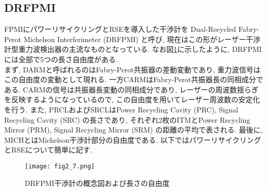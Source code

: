 \subsection{DRFPMI}
FPMIにパワーリサイクリングとRSEを導入した干渉計を Dual-Recycled Fabry-Perot Michelson Interferimeter (DRFPMI) と呼び, 現在はこの形がレーザー干渉計型重力波検出器の主流なものとなっている. なお図\ref{fig2.7}に示したように, DRFPMIには全部で5つの長さ自由度がある. \\
\quad まず, DARMと呼ばれるのはFabry-Perot共振器の差動変動であり, 重力波信号はこの自由度の変動として現れる. 一方CARMはFabry-Perot共振器長の同相成分である. CARMの信号は共振器長変動の同相成分であり, レーザーの周波数揺らぎを反映するようになっているので, この自由度を用いてレーザー周波数の安定化を行う. また, PRCLおよびSRCLはPower Recycling Cavity (PRC), Signal Recycling Cavity (SRC) の長さであり, それぞれ2枚のITMとPower Recycling Mirror (PRM), Signal Recycling Mirror (SRM) の距離の平均で表される. 最後に, MICHとはMichelson干渉計部分の自由度である. 以下ではパワーリサイクリングとRSEについて簡単に記す. 
\begin{figure}[H]
\begin{center}
\texttt{[image: fig2\_7.png]}
\caption[DRFPMI干渉計]{DRFPMI干渉計の概念図および長さの自由度}
\label{fig2.7}
\end{center}
\end{figure}
